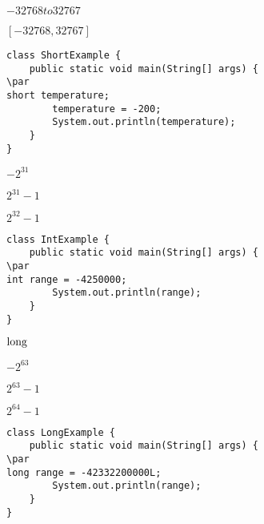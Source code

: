 \documentclass{book}
\def\lthtmlcheckvsize{\ifdim\ht\sizebox<\vsize 
  \ifdim\wd\sizebox<\hsize\expandafter\hfill\fi \expandafter\vfill
  \else\expandafter\vss\fi}%
\begin{document}
{\newpage\clearpage
{}%
$-32768 to 32767$%
\lthtmlindisplaymathZ
\lthtmlcheckvsize\clearpage}

{\newpage\clearpage
{}%
$[-32768, 32767]$%
\lthtmlindisplaymathZ
\lthtmlcheckvsize\clearpage}

{\newpage\clearpage
{}%
\begin{lstlisting}
class ShortExample {
    public static void main(String[] args) {
\par
short temperature;
        temperature = -200;
        System.out.println(temperature);
    }
}
\end{lstlisting}%
\lthtmlfigureZ
\lthtmlcheckvsize\clearpage}

{\newpage\clearpage
{}%
$-2^31$%
\lthtmlindisplaymathZ
\lthtmlcheckvsize\clearpage}

{\newpage\clearpage
{}%
$2^{31}-1$%
\lthtmlindisplaymathZ
\lthtmlcheckvsize\clearpage}

{\newpage\clearpage
{}%
$2^{32}-1$%
\lthtmlindisplaymathZ
\lthtmlcheckvsize\clearpage}

{\newpage\clearpage
{}%
\begin{lstlisting}
class IntExample {
    public static void main(String[] args) {
\par
int range = -4250000;
        System.out.println(range);
    }
}
\end{lstlisting}%
\lthtmlfigureZ
\lthtmlcheckvsize\clearpage}

{\newpage\clearpage
{}%
$\lstinline{long}$%
\lthtmlindisplaymathZ
\lthtmlcheckvsize\clearpage}

{\newpage\clearpage
{}%
$-2^63$%
\lthtmlindisplaymathZ
\lthtmlcheckvsize\clearpage}

{\newpage\clearpage
{}%
$2^{63}-1$%
\lthtmlindisplaymathZ
\lthtmlcheckvsize\clearpage}

{\newpage\clearpage
{}%
$2^{64}-1$%
\lthtmlindisplaymathZ
\lthtmlcheckvsize\clearpage}

{\newpage\clearpage
{}%
\begin{lstlisting}
class LongExample {
    public static void main(String[] args) {
\par
long range = -42332200000L;
        System.out.println(range);
    }
}
\end{lstlisting}%
\lthtmlfigureZ
\lthtmlcheckvsize\clearpage}
\end{document}
